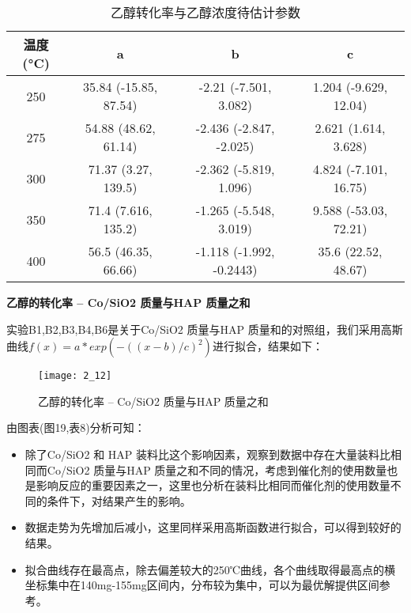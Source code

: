 \documentclass[withoutpreface,bwprint]{cumcmthesis} %
\begin{document}
\begin{table}[!htbp]
	\caption{乙醇转化率与乙醇浓度待估计参数}\label{tab:001} \centering
	\begin{tabular}{cccc}
		\toprule[1.5pt]
		温度(°C) & a & b & c \\
		\midrule[1pt]
		250 & 35.84  (-15.85, 87.54) &  -2.21  (-7.501, 3.082) &  1.204  (-9.629, 12.04) \\
		275 & 54.88  (48.62, 61.14) &   -2.436  (-2.847, -2.025) & 2.621  (1.614, 3.628)  \\
		300 &71.37  (3.27, 139.5) & -2.362  (-5.819, 1.096) &  4.824  (-7.101, 16.75) \\
		350 &71.4  (7.616, 135.2) &  -1.265  (-5.548, 3.019) & 9.588  (-53.03, 72.21)  \\
		400 & 56.5  (46.35, 66.66)  &   -1.118  (-1.992, -0.2443) &  35.6  (22.52, 48.67)  \\
		\bottomrule[1.5pt]
	\end{tabular}
\end{table}







\newpage
\textbf{乙醇的转化率 -- Co/SiO2 质量与HAP 质量之和}

实验B1,B2,B3,B4,B6是关于Co/SiO2 质量与HAP 质量和的对照组，我们采用高斯曲线$f(x) =  a*exp(-((x-b)/c)^2)$进行拟合，结果如下：
\begin{figure}[!h]
	\centering
	\texttt{[image: 2\_12]}
	\caption{乙醇的转化率 -- Co/SiO2 质量与HAP 质量之和}
	\label{fig:circuit-diagram1}
\end{figure}


由图表(图19,表8)分析可知：
\begin{itemize}
	\item 除了Co/SiO2 和 HAP 装料比这个影响因素，观察到数据中存在大量装料比相同而Co/SiO2 质量与HAP 质量之和不同的情况，考虑到催化剂的使用数量也是影响反应的重要因素之一，这里也分析在装料比相同而催化剂的使用数量不同的条件下，对结果产生的影响。
	\item 数据走势为先增加后减小，这里同样采用高斯函数进行拟合，可以得到较好的结果。
	\item 拟合曲线存在最高点，除去偏差较大的250℃曲线，各个曲线取得最高点的横坐标集中在140mg-155mg区间内，分布较为集中，可以为最优解提供区间参考。
\end{itemize}
\end{document}
